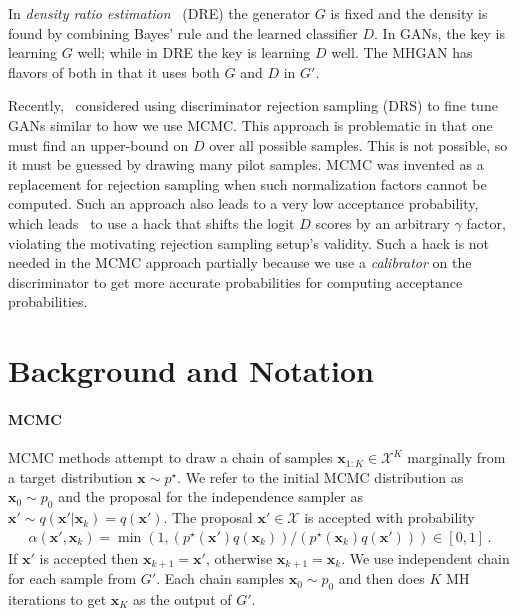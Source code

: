 \documentclass{article}
\renewcommand{\vec}[1]{{\boldsymbol{\mathbf{#1}}}} %
\newcommand{\set}[1]{\mathcal{#1}}
\newcommand{\sample}{\sim}
\newcommand{\given}{|}
\newcommand{\target}{{p^\star}}
\newcommand{\prop}{q}
\newcommand{\pinit}{{p_0}}
\newcommand{\accept}{\alpha}
\newcommand{\setx}{\set{X}}
\begin{document}
In \emph{density ratio estimation}~\citep{Sugiyama2012} (DRE) the generator $G$ is fixed and the density is found by combining Bayes' rule and the learned classifier $D$.
In GANs, the key is learning $G$ well; while in DRE the key is learning $D$ well.
The MHGAN has flavors of both in that it uses both $G$ and $D$ in $G'$.

Recently,~\citet{Azadi2018} considered using discriminator rejection sampling (DRS) to fine tune GANs similar to how we use MCMC\@.
This approach is problematic in that one must find an upper-bound on $D$ over all possible samples.
This is not possible, so it must be guessed by drawing many pilot samples.
MCMC was invented as a replacement for rejection sampling when such normalization factors cannot be computed.
Such an approach also leads to a very low acceptance probability, which leads~\citet{Azadi2018} to use a hack that shifts the logit $D$ scores by an arbitrary $\gamma$ factor, violating the motivating rejection sampling setup's validity.
Such a hack is not needed in the MCMC approach partially because we use a \emph{calibrator} on the discriminator to get more accurate probabilities for computing acceptance probabilities.

\section{Background and Notation}
\label{sec:Background}

\paragraph{MCMC}
MCMC methods attempt to draw a chain of samples $\vec x_{1:K} \in \setx^K$ marginally from a target distribution $\vec x \sample \target$.
We refer to the initial MCMC distribution as $\vec x_0 \sample \pinit$ and the proposal for the independence sampler as $\vec x' \sample \prop(\vec x' \given \vec x_k)=\prop(\vec x')$.
The proposal $\vec x' \in \setx$ is accepted with probability
\begin{align}
  \accept(\vec x', \vec x_k) = \min\left(1, (\target(\vec x')\prop(\vec x_k))/(\target(\vec x_k)\prop(\vec x'))\right) \in [0,1]\,. \label{eq:alpha def}
\end{align}
If $\vec x'$ is accepted then $\vec x_{k+1} = \vec x'$, otherwise $\vec x_{k+1} = \vec x_k$.
We use independent chain for each sample from $G'$.
Each chain samples $\vec x_0 \sample \pinit$ and then does $K$ MH iterations to get $\vec x_K$ as the output of $G'$.
\end{document}
